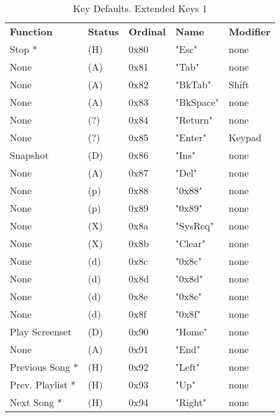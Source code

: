    \begin{table}[htb!]
      \centering
      \caption{Key Defaults. Extended Keys 1}
      \label{table:key_defaults_extended_keys_1}
      \begin{tabular}{l l l l l}
        \textbf{Function} & \textbf{Status} & \textbf{Ordinal} & \textbf{Name} & \textbf{Modifier} \\
        Stop *             & (H)  &  0x80   & "Esc"        & none \\
        None               & (A)  &  0x81   & "Tab"        & none \\
        None               & (A)  &  0x82   & "BkTab"      & Shift \\
        None               & (A)  &  0x83   & "BkSpace"    & none \\
        None               & (?)  &  0x84   & "Return"     & none \\
        None               & (?)  &  0x85   & "Enter"      & Keypad \\
        Snapshot           & (D)  &  0x86   & "Ins"        & none \\
        None               & (A)  &  0x87   & "Del"        & none \\
        None               & (p)  &  0x88   & "0x88"       & none \\
        None               & (p)  &  0x89   & "0x89"       & none \\
        None               & (X)  &  0x8a   & "SysReq"     & none \\
        None               & (X)  &  0x8b   & "Clear"      & none \\
        None               & (d)  &  0x8c   & "0x8c"       & none \\
        None               & (d)  &  0x8d   & "0x8d"       & none \\
        None               & (d)  &  0x8e   & "0x8e"       & none \\
        None               & (d)  &  0x8f   & "0x8f"       & none \\
        Play Screenset     & (D)  &  0x90   & "Home"       & none \\
        None               & (A)  &  0x91   & "End"        & none \\
        Previous Song *    & (H)  &  0x92   & "Left"       & none \\
        Prev. Playlist *   & (H)  &  0x93   & "Up"         & none \\
        Next Song *        & (H)  &  0x94   & "Right"      & none \\

\end{tabular}
\end{table}
